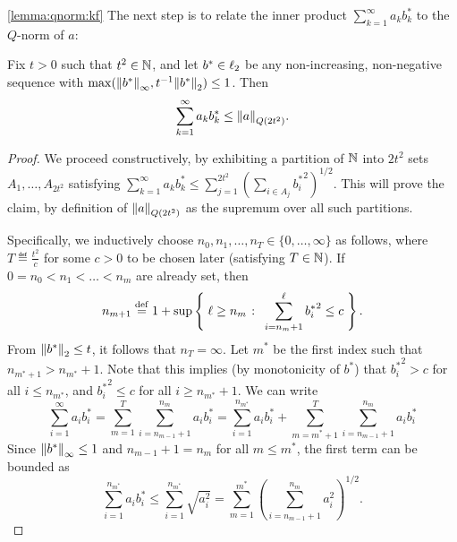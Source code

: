 \begin{proofof}{\cref{lemma:qnorm:kf}}
  The next step is to relate the inner product $\sum_{k=1}^\infty a_kb^\ast_k$ to the $Q$-norm of $a$:
  \begin{claim}\label{claim:proof:lemma:qnorm:kf:2}
  Fix $t > 0$ such that $t^2\in\N$, and let $b^\ast\in\lp[2]$ be any non-increasing, non-negative sequence with $\max( \norminf{b^\ast}, t^{-1}\normtwo{b^\ast} ) \leq 1$. Then
  \[
      \sum_{k=1}^\infty a_kb^\ast_k \leq \norm{a}_{Q(2t^2)}.
  \]
  \end{claim}
  \begin{proof}
  We proceed constructively, by exhibiting a partition of $\N$ into $2t^2$ sets $A_1,\dots, A_{2t^2}$ satisfying $\sum_{k=1}^\infty a_kb^\ast_k \leq \sum_{j=1}^{2t^2} \left( \sum_{i\in A_j} {b^\ast_i}^2 \right)^{1/2}$. This will prove the claim, by definition of $\norm{a}_{Q(2t^2)}$ as the supremum over all such partitions.
  
   Specifically, we inductively choose $n_0,n_1,\dots,n_{T}\in\{0,\dots,\infty\}$ as follows, where $T\eqdef \frac{t^2}{c}$ for some $c>0$ to be chosen later (satisfying $T\in\N$). If $0=n_0 < n_1 < \dots < n_m$ are already set, then
  \[
      n_{m+1} \eqdef 1 + \sup\setOfSuchThat{ \ell \geq n_m }{ \sum_{i=n_m+1}^\ell {b^\ast_i}^2 \leq c  }.
  \]
  From $\normtwo{b^\ast}\leq t$, it follows that $n_{T} = \infty$. Let $m^\ast$ be the first index such that $n_{m^\ast+1} > n_{m^\ast} +1$. Note that this implies (by monotonicity of $b^\ast$) that ${b^\ast_i}^2 > c$ for all $i \leq n_{m^\ast}$, and ${b^\ast_i}^2 \leq c$ for all $i \geq n_{m^\ast}+1$. We can write
  \[
      \sum_{i=1}^\infty a_i{b^\ast_i} 
      = \sum_{m=1}^{T} \sum_{i=n_{m-1}+1}^{n_m} a_i{b^\ast_i}
            = \sum_{i=1}^{n_{m^\ast}} a_i{b^\ast_i} + \sum_{m=m^\ast+1}^{T} \sum_{i=n_{m-1}+1}^{n_m} a_i{b^\ast_i}
  \]
   Since $\norminf{b^\ast}\leq 1$ and $n_{m-1}+1 = n_m$ for all $m \leq m^\ast$, the first term can be bounded as
   \[
        \sum_{i=1}^{n_{m^\ast}} a_ib^\ast_i \leq  \sum_{i=1}^{n_{m^\ast}} \sqrt{a_i^2} = \sum_{m=1}^{m^\ast} \left( \sum_{i=n_{m-1}+1}^{n_m} a_i^2 \right)^{1/2}.
   \]
  

\end{proof}
\end{proofof}
